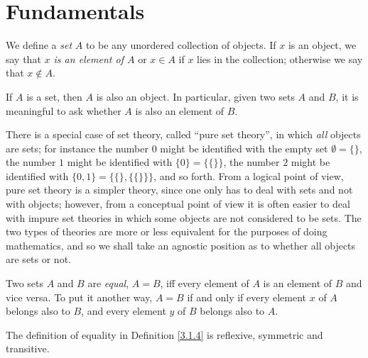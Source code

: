 \section{Fundamentals}\label{sec 3.1}

\begin{definition}\label{3.1.1}
    We define a \emph{set} \(A\) to be any unordered collection of objects.
    If \(x\) is an object, we say that \emph{\(x\) is an element of \(A\)} or \(x \in A\) if \(x\) lies in the collection;
    otherwise we say that \(x \notin A\).
\end{definition}

\begin{axiom}\label{3.1}
    If \(A\) is a set, then \(A\) is also an object.
    In particular, given two sets \(A\) and \(B\), it is meaningful to ask whether \(A\) is also an element of \(B\).
\end{axiom}

\setcounter{theorem}{2}
\begin{remark}\label{3.1.3}
    There is a special case of set theory, called ``pure set theory'', in which \emph{all} objects are sets;
    for instance the number \(0\) might be identified with the empty set \(\emptyset = \{\}\), the number \(1\) might be identified with \(\{0\} = \{\{\}\}\), the number \(2\) might be identified with \(\{0, 1\} = \{\{\}, \{\{\}\}\}\), and so forth.
    From a logical point of view, pure set theory is a simpler theory, since one only has to deal with sets and not with objects;
    however, from a conceptual point of view it is often easier to deal with impure set theories in which some objects are not considered to be sets.
    The two types of theories are more or less equivalent for the purposes of doing mathematics, and so we shall take an agnostic position as to whether all objects are sets or not.
\end{remark}

\begin{definition}\label{3.1.4}
    Two sets \(A\) and \(B\) are \emph{equal}, \(A = B\), iff every element of \(A\) is an element of \(B\) and vice versa.
    To put it another way, \(A = B\) if and only if every element \(x\) of \(A\) belongs also to \(B\), and every element \(y\) of \(B\) belongs also to \(A\).
\end{definition}

\begin{additional corollary}\label{ac 3.1.1}
The definition of equality in Definition \ref{3.1.4} is reflexive, symmetric and transitive.
\end{additional corollary}

